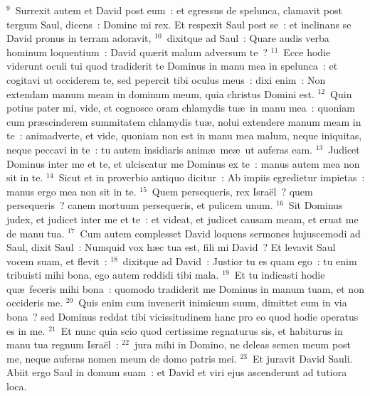 ${}^{9}$~Surrexit autem et David post eum~: et egressus de spelunca, clamavit post tergum Saul, dicens~: Domine mi rex. Et respexit Saul post se~: et inclinans se David pronus in terram adoravit,
${}^{10}$~dixitque ad Saul~: Quare audis verba hominum loquentium~: David qu\ae rit malum adversum te~?
${}^{11}$~Ecce hodie viderunt oculi tui quod tradiderit te Dominus in manu mea in spelunca~: et cogitavi ut occiderem te, sed pepercit tibi oculus meus~: dixi enim~: Non extendam manum meam in dominum meum, quia christus Domini est.
${}^{12}$~Quin potius pater mi, vide, et cognosce oram chlamydis tu\ae\ in manu mea~: quoniam cum pr\ae scinderem summitatem chlamydis tu\ae , nolui extendere manum meam in te~: animadverte, et vide, quoniam non est in manu mea malum, neque iniquitas, neque peccavi in te~: tu autem insidiaris anim\ae\ me\ae\ ut auferas eam.
${}^{13}$~Judicet Dominus inter me et te, et ulciscatur me Dominus ex te~: manus autem mea non sit in te.
${}^{14}$~Sicut et in proverbio antiquo dicitur~: Ab impiis egredietur impietas~: manus ergo mea non sit in te.
${}^{15}$~Quem persequeris, rex Isra\"el~? quem persequeris~? canem mortuum persequeris, et pulicem unum.
${}^{16}$~Sit Dominus judex, et judicet inter me et te~: et videat, et judicet causam meam, et eruat me de manu tua.
${}^{17}$~Cum autem complesset David loquens sermones hujuscemodi ad Saul, dixit Saul~: Numquid vox h\ae c tua est, fili mi David~? Et levavit Saul vocem suam, et flevit~:
${}^{18}$~dixitque ad David~: Justior tu es quam ego~: tu enim tribuisti mihi bona, ego autem reddidi tibi mala.
${}^{19}$~Et tu indicasti hodie qu\ae\ feceris mihi bona~: quomodo tradiderit me Dominus in manum tuam, et non occideris me.
${}^{20}$~Quis enim cum invenerit inimicum suum, dimittet eum in via bona~? sed Dominus reddat tibi vicissitudinem hanc pro eo quod hodie operatus es in me.
${}^{21}$~Et nunc quia scio quod certissime regnaturus sis, et habiturus in manu tua regnum Isra\"el~:
${}^{22}$~jura mihi in Domino, ne deleas semen meum post me, neque auferas nomen meum de domo patris mei.
${}^{23}$~Et juravit David Sauli. Abiit ergo Saul in domum suam~: et David et viri ejus ascenderunt ad tutiora loca.

